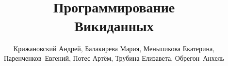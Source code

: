 \documentclass[nofonts,justified,nobib,openany]{tufte-book}%
\title{Программирование \\Викиданных}%
\author[Крижановский и др.]{Крижановский Андрей, Балакирева Мария, Меньшикова Екатерина, \mbox{Паренченков Евгений}, Потес Артём, Трубина Елизавета, \mbox{Обрегон Анхель}}
\theoremstyle{definition}
\newcommand{\monthyear}{%
  \ifcase\month\or January\or February\or March\or April\or May\or June\or
  July\or August\or September\or October\or November\or
  December\fi\space\number\year
}
\newcommand{\blankpage}{\newpage\hbox{}\thispagestyle{empty}\newpage}
\begin{document}


\maketitle


\iffalse

\newpage
\begin{fullwidth}
УДК 004 \\
ББК 32.973 \\
\hphantom{ББК} П784
~\vfill
\thispagestyle{empty}
\setlength{\parindent}{0pt}
\setlength{\parskip}{\baselineskip}

Это учебник по Викиданным и языку SPARQL. 
Викиданные~--- это огромная база данных, лежащая в основе Википедии и связывающая вики-проекты воедино.
Прочитав книгу, вы сможете извлекать из Викиданных информацию с~помощью SPARQL-скриптов, 
затем обрабатывать её и строить по ней таблицы, графики и карты. \\ 
Учебник предназначен для студентов, %
изучающих информатику, 
для тех, кто хочет развить свои аналитические навыки, 
    научиться программировать 
    и глубже разбираться в принципах работы самого компьютерного вики-проекта. \\
    Дополнительные материалы доступны онлайн 
    (\href{https://w.wiki/62E}{https://ru.wikiversity.org/wiki/Программирование\_Викиданных}) 
    в одноимённом курсе Викиверситета.
Учебник распространяется на правах свободной лицензии 
    \href{https://creativecommons.org/licenses/by-sa/4.0/deed.ru}{Creative Commons Attribution-ShareAlike}.

Copyleft \textcopyleft\ \the\year\ \thanklessauthor

\par\smallcaps{\thanklesspublisher}



\end{fullwidth}
\fi 
\begin{fullwidth}



\tableofcontents

\end{fullwidth}
\end{document}
